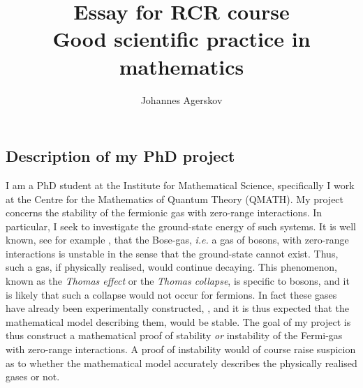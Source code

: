 \documentclass[a4paper, 11pt]{article} %
\title{Essay for RCR course\\
	\large Good scientific practice in mathematics}
\author{Johannes Agerskov}
\begin{document}
	\maketitle
\subsection*{Description of my PhD project}
I am a PhD student at the Institute for Mathematical Science, specifically I work at the Centre for the Mathematics of Quantum Theory (QMATH). My project concerns the stability of the fermionic gas with zero-range interactions. In particular, I seek to investigate the ground-state energy of such systems. It is well known, see for example \cite{PhysRev.47.903}, that the Bose-gas, \emph{i.e.} a gas of bosons, with zero-range interactions is unstable in the sense that the ground-state cannot exist. Thus, such a gas, if physically realised, would continue decaying. This phenomenon, known as the \emph{Thomas effect} or the \emph{Thomas collapse}, is specific to bosons, and it is likely that such a collapse would not occur for fermions. In fact these gases have already been experimentally constructed, \cite{PhysRevLett.105.070402}, and it is thus expected that the mathematical model describing them, would be stable. The goal of my project is thus construct a mathematical proof of stability \emph{or} instability of the Fermi-gas with zero-range interactions. A proof of instability would of course raise suspicion as to whether the mathematical model accurately describes the physically realised gases or not.
\end{document}
